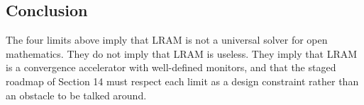 \subsection{Conclusion}
The four limits above imply that LRAM is not a universal solver for open mathematics. They do not imply that LRAM is useless. They imply that LRAM is a convergence accelerator with well-defined monitors, and that the staged roadmap of Section 14 must respect each limit as a design constraint rather than an obstacle to be talked around.
